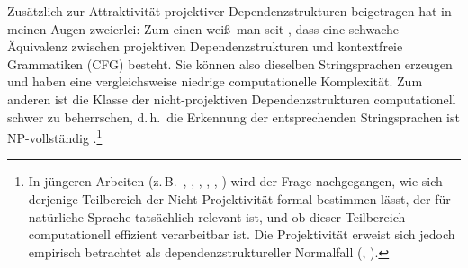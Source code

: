 Zusätzlich zur Attraktivität projektiver Dependenzstrukturen beigetragen hat in meinen Augen zweierlei: Zum einen wei\ss\ man seit \cite{Gaifman:65} , dass eine schwache Äquivalenz zwischen projektiven Dependenzstrukturen und kontextfreie Grammatiken (CFG) besteht. Sie können also dieselben Stringsprachen erzeugen und haben eine vergleichsweise niedrige computationelle Komplexität. Zum anderen ist die Klasse der nicht-projektiven Dependenzstrukturen computationell schwer zu beherrschen, d.\,h.\ die Erkennung der entsprechenden Stringsprachen ist NP-vollständig \citep{Neuhaus:Broeker:97}.\footnote{In jüngeren Arbeiten (z.\,B.\ \citealt{Holan:etal:98}, \citealt{Dikovsky:Modina:00}, \citealt{Bodirsky:etal:05}, \citealt{Havelka:07}, \citealt{Maier:Lichte:11}, \citealt{Gomez:etal:11}) wird der Frage nachgegangen, wie sich derjenige Teilbereich der Nicht-Projektivität formal bestimmen lässt, der für natürliche Sprache tatsächlich relevant ist, und ob dieser Teilbereich computationell effizient verarbeitbar ist. Die Projektivität erweist sich jedoch empirisch betrachtet als dependenzstruktureller Normalfall (\citealt{Kuhlmann:Nivre:06}, \citealt{Maier:Lichte:11}).} \\

